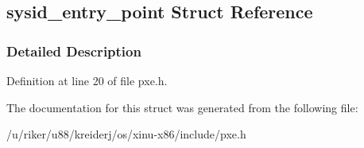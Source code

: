 \hypertarget{structsysid__entry__point}{}\subsection{sysid\+\_\+entry\+\_\+point Struct Reference}
\label{structsysid__entry__point}


\subsubsection{Detailed Description}


Definition at line 20 of file pxe.\+h.



The documentation for this struct was generated from the following file\+:\begin{DoxyCompactItemize}
\item 
/u/riker/u88/kreiderj/os/xinu-\/x86/include/pxe.\+h\end{DoxyCompactItemize}
